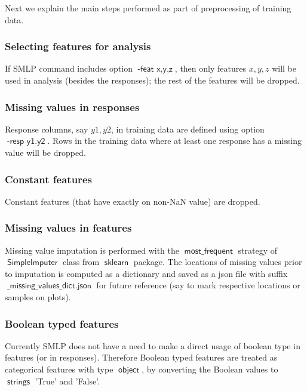 \documentclass[a4paper,parskip=half]{article} %
\newcommand*\option[1]{\operatorname{\mathsf{#1}}} %
\newcommand*\suffix[1]{\operatorname{\mathsf{#1}}} %
\newcommand*\package[1]{\operatorname{\mathsf{#1}}} %
\newcommand*\module[1]{\operatorname{\mathsf{#1}}} %
\newcommand*\dtype[1]{\operatorname{\mathsf{#1}}} %
\begin{document}
Next we explain the main steps performed as part of preprocessing of training data.

\subsubsection{Selecting features for analysis} 

If SMLP command includes option $\option{-feat\,\, x,y,z}$, then only features $x,y,z$ will be used
in analysis (besides the responses); the rest of the features will be dropped.

\subsubsection{Missing values in responses}  

Response columns, say $y1, y2$, in training data are defined using option $\option{-resp \,\,y1. y2}$.
Rows in the training data where at least one response has a missing value will be dropped.


\subsubsection{Constant features} 

Constant features (that have exactly on non-NaN value) are dropped.


\subsubsection{Missing values in features} 

Missing value imputation is performed with the $\option{most\_frequent}$ strategy of 
$\module{SimpleImputer}$ class from $\package{sklearn}$ package. The locations of missing values
prior to imputation is computed as a dictionary and saved as a json file with suffix $\suffix{\_missing\_values\_dict.json}$
for future reference (say to mark respective locations or samples on plots).

\subsubsection{Boolean typed features} 

Currently SMLP does not have a need to make a direct usage of boolean type in features (or in responses). 
Therefore Boolean typed features are treated as categorical  features with type $\dtype{object}$, by converting 
the Boolean values to $\dtype{strings}$ 'True' and 'False'.
\end{document}
